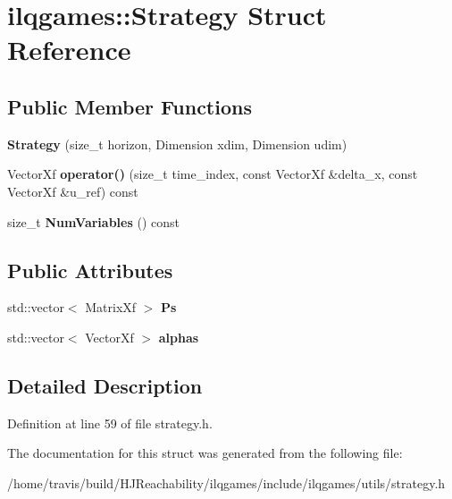 \hypertarget{structilqgames_1_1_strategy}{}\section{ilqgames\+:\+:Strategy Struct Reference}
\label{structilqgames_1_1_strategy}
\subsection*{Public Member Functions}
\begin{DoxyCompactItemize}
\item 
{\bfseries Strategy} (size\+\_\+t horizon, Dimension xdim, Dimension udim)\hypertarget{structilqgames_1_1_strategy_a60de8ff226997a36f83ffd157c868456}{}\label{structilqgames_1_1_strategy_a60de8ff226997a36f83ffd157c868456}

\item 
Vector\+Xf {\bfseries operator()} (size\+\_\+t time\+\_\+index, const Vector\+Xf \&delta\+\_\+x, const Vector\+Xf \&u\+\_\+ref) const \hypertarget{structilqgames_1_1_strategy_ab2c02755490cfb3d88a062d6b0412306}{}\label{structilqgames_1_1_strategy_ab2c02755490cfb3d88a062d6b0412306}

\item 
size\+\_\+t {\bfseries Num\+Variables} () const \hypertarget{structilqgames_1_1_strategy_afcdff19912799107b7e18c021eb76078}{}\label{structilqgames_1_1_strategy_afcdff19912799107b7e18c021eb76078}

\end{DoxyCompactItemize}
\subsection*{Public Attributes}
\begin{DoxyCompactItemize}
\item 
std\+::vector$<$ Matrix\+Xf $>$ {\bfseries Ps}\hypertarget{structilqgames_1_1_strategy_a388b037f047ca7ae2070dec436100331}{}\label{structilqgames_1_1_strategy_a388b037f047ca7ae2070dec436100331}

\item 
std\+::vector$<$ Vector\+Xf $>$ {\bfseries alphas}\hypertarget{structilqgames_1_1_strategy_a23297cf741c8faf93010f24dca1ce582}{}\label{structilqgames_1_1_strategy_a23297cf741c8faf93010f24dca1ce582}

\end{DoxyCompactItemize}


\subsection{Detailed Description}


Definition at line 59 of file strategy.\+h.



The documentation for this struct was generated from the following file\+:\begin{DoxyCompactItemize}
\item 
/home/travis/build/\+H\+J\+Reachability/ilqgames/include/ilqgames/utils/strategy.\+h\end{DoxyCompactItemize}
